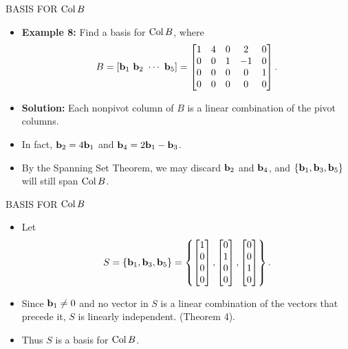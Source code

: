 \begin{frame}[shrink=15]{BASIS FOR $\operatorname{Col} B$}
\begin{itemize}
\item \textbf{Example 8:} Find a basis for $\operatorname{Col} B$, where
\[
B=[\mathbf{b}_1\ \mathbf{b}_2\ \cdots\ \mathbf{b}_5]
=\begin{bmatrix}
1&4&0&2&0\\
0&0&1&-1&0\\
0&0&0&0&1\\
0&0&0&0&0
\end{bmatrix}.
\]
\item \textbf{Solution:} Each nonpivot column of $B$ is a linear combination of the pivot columns.
\item In fact, $\mathbf{b}_2=4\mathbf{b}_1$ and $\mathbf{b}_4=2\mathbf{b}_1-\mathbf{b}_3$.
\item By the Spanning Set Theorem, we may discard $\mathbf{b}_2$ and $\mathbf{b}_4$, and $\{\mathbf{b}_1,\mathbf{b}_3,\mathbf{b}_5\}$ will still span $\operatorname{Col} B$.
\end{itemize}
\end{frame}

\begin{frame}[shrink=14]{BASIS FOR $\operatorname{Col} B$}
\begin{itemize}
\item Let
\[
S=\{\mathbf{b}_1,\mathbf{b}_3,\mathbf{b}_5\}
=\left\{
\begin{bmatrix}1\\0\\0\\0\end{bmatrix},
\begin{bmatrix}0\\1\\0\\0\end{bmatrix},
\begin{bmatrix}0\\0\\1\\0\end{bmatrix}
\right\}.
\]
\item Since $\mathbf{b}_1\ne0$ and no vector in $S$ is a linear combination of the vectors that precede it, $S$ is linearly independent. (Theorem 4).
\item Thus $S$ is a basis for $\operatorname{Col} B$.
\end{itemize}
\end{frame}

